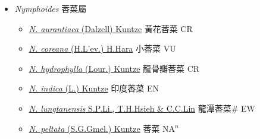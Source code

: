 
  \begin{itemize}
 \item[] \textit{Nymphoides} 莕菜屬
                    
  \begin{itemize}
        \item[] \href{http://www.theplantlist.org/tpl1.1/search?q=Nymphoides+aurantiaca}{\textit{N. aurantiaca} (Dalzell) Kuntze}   黃花莕菜 CR
        \item[] \href{http://www.theplantlist.org/tpl1.1/search?q=Nymphoides+coreana}{\textit{N. coreana} (H.L'ev.) H.Hara}   小莕菜 VU
        \item[] \href{http://www.theplantlist.org/tpl1.1/search?q=Nymphoides+hydrophylla}{\textit{N. hydrophylla} (Lour.) Kuntze}   龍骨瓣莕菜 CR
        \item[] \href{http://www.theplantlist.org/tpl1.1/search?q=Nymphoides+indica}{\textit{N. indica} (L.) Kuntze}   印度莕菜 EN
        \item[] \href{http://www.theplantlist.org/tpl1.1/search?q=Nymphoides+lungtanensis}{\textit{N. lungtanensis} S.P.Li., T.H.Hsieh \& C.C.Lin}   龍潭莕菜\# EW
        \item[] \href{http://www.theplantlist.org/tpl1.1/search?q=Nymphoides+peltata}{\textit{N. peltata} (S.G.Gmel.) Kuntze}   莕菜 NA$^n$
  \end{itemize}
  \end{itemize}
